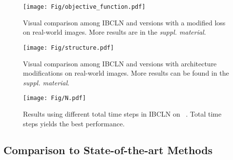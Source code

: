 \documentclass[10pt,twocolumn,letterpaper]{article}
\begin{document}
\begin{figure*}[h]
    \begin{center}
        \texttt{[image: Fig/objective\_function.pdf]}
    \end{center}
    \vspace{-1em}
    \caption{Visual comparison among IBCLN and versions with a modified loss on real-world images. More results are in the \textit{suppl. material}.}
    \vspace{-0.8em}
    \label{fig:objective_function}
\end{figure*}

\begin{figure}[h]
    \begin{center}
        \texttt{[image: Fig/structure.pdf]}
    \end{center}
    \vspace{-0.8em}
    \caption{Visual comparison among IBCLN and versions with architecture modifications on real-world images. More results can be found in the \textit{suppl. material}. 
    }
    \vspace{-1em}
    \label{fig:architecture}
\end{figure}



\begin{figure}[h]
    \vspace{-1em}
    \begin{center}
        \texttt{[image: Fig/N.pdf]}
    \end{center}
    \vspace{-1.2em}
    \caption{Results using different total time steps  in IBCLN on ~\cite{wan2017benchmarking}. Total time steps  yields the best performance.
    }
    \vspace{-0.5em}
    \label{fig:N}
\end{figure}

\vspace{-0.2em}
\subsection{Comparison to State-of-the-art Methods}
\end{document}
